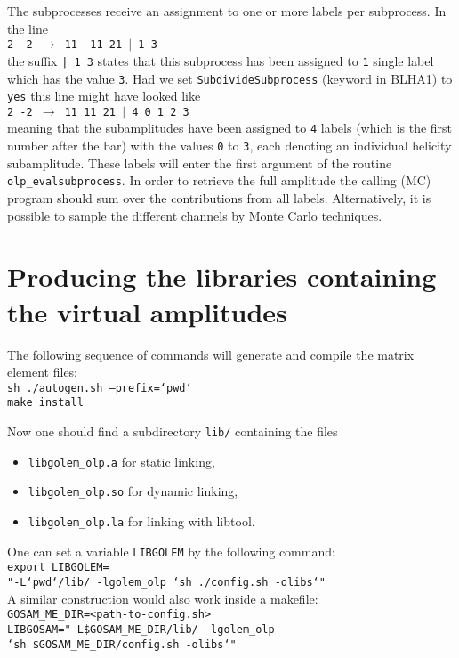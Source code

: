 The subprocesses receive an assignment to one or more
labels per subprocess. In the line\\
{\tt 2 -2 $\to$ 11 -11 21 $|$ 1 3}\\
the suffix \texttt{| 1 3}
states that this subprocess has been assigned to \texttt{1}
single label which has the value \texttt{3}. 
Had we set \texttt{SubdivideSubprocess} (keyword in BLHA1)
to \texttt{yes} this line might have looked like\\
{\tt 2 -2 $\to$ 11 11 21 $|$ 4 0 1 2 3}\\
meaning that the subamplitudes
have been assigned to
\texttt{4} labels (which is the first number after the bar) with
the values \texttt{0} to \texttt{3}, each denoting 
an individual helicity subamplitude. These labels will enter the
first argument of the routine \texttt{olp\_evalsubprocess}.
In order to retrieve the full amplitude the calling (MC) program should sum
over the contributions from all labels. Alternatively, it is possible to
sample the different channels by Monte Carlo techniques.

\section{Producing the libraries containing the virtual amplitudes}
The following sequence of commands will generate and compile the matrix
element files:\\
{\tt sh ./autogen.sh --prefix=`pwd`}\\
{\tt make install}

Now one should find a subdirectory \texttt{lib/} containing the files
\begin{itemize}
\item \texttt{libgolem\_olp.a} for static linking,
\item \texttt{libgolem\_olp.so} for dynamic linking,
\item \texttt{libgolem\_olp.la} for linking with libtool.
\end{itemize}


One can set  a variable \texttt{LIBGOLEM} by the following command:\\
{\tt export LIBGOLEM=\ }\\
{\tt "-L`pwd`/lib/ -lgolem\_olp `sh ./config.sh -olibs`"}\\
A similar construction would also work inside a makefile:\\
{\tt GOSAM\_ME\_DIR=<path-to-config.sh>}\\
{\tt LIBGOSAM="-L\${GOSAM\_ME\_DIR}/lib/ -lgolem\_olp }\\
{\tt    `sh \${GOSAM\_ME\_DIR}/config.sh -olibs`"}


